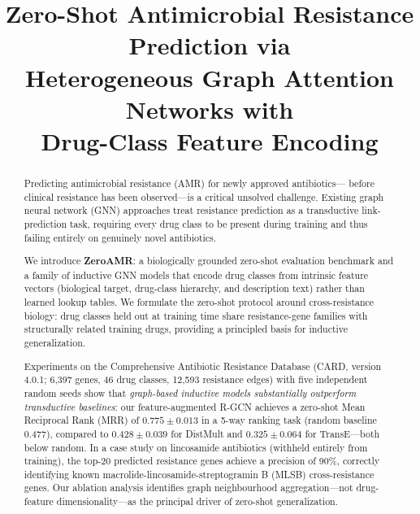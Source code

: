\documentclass[conference]{IEEEtran}
\begin{document}
\title{Zero-Shot Antimicrobial Resistance Prediction via\\
Heterogeneous Graph Attention Networks with\\Drug-Class Feature Encoding}

\author{
}

\maketitle

\begin{abstract}
Predicting antimicrobial resistance (AMR) for newly approved antibiotics—
before clinical resistance has been observed—is a critical unsolved
challenge. Existing graph neural network (GNN) approaches treat resistance
prediction as a transductive link-prediction task, requiring every drug
class to be present during training and thus failing entirely on genuinely
novel antibiotics.

We introduce \textbf{ZeroAMR}: a biologically grounded zero-shot evaluation
benchmark and a family of inductive GNN models that encode drug classes
from intrinsic feature vectors (biological target, drug-class hierarchy,
and description text) rather than learned lookup tables. We formulate
the zero-shot protocol around cross-resistance biology: drug classes held
out at training time share resistance-gene families with structurally
related training drugs, providing a principled basis for inductive
generalization.

Experiments on the Comprehensive Antibiotic Resistance Database (CARD,
version 4.0.1; 6,397 genes, 46 drug classes, 12,593 resistance edges)
with five independent random seeds show that \emph{graph-based inductive
models substantially outperform transductive baselines}: our
feature-augmented R-GCN achieves a zero-shot Mean Reciprocal Rank (MRR)
of $0.775 \pm 0.013$ in a 5-way ranking task (random baseline 0.477),
compared to $0.428 \pm 0.039$ for DistMult and $0.325 \pm 0.064$ for
TransE—both below random. In a case study on lincosamide antibiotics
(withheld entirely from training), the top-20 predicted resistance genes
achieve a precision of 90\%, correctly identifying known
macrolide-lincosamide-streptogramin B (MLSB) cross-resistance genes.
Our ablation analysis identifies graph neighbourhood aggregation—not
drug-feature dimensionality—as the principal driver of zero-shot
generalization.
\end{abstract}
\end{document}
